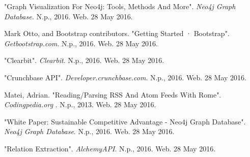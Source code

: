 \begin{thebibliography}{9}
	"Graph Visualization For Neo4j: Tools, Methods And More". \textit{Neo4j Graph Database.} N.p., 2016. Web. 28 May 2016.
	
	Mark Otto, and Bootstrap contributors. "Getting Started · Bootstrap". 
	\textit{Getbootstrap.com}. N.p., 2016. Web. 28 May 2016.
	
	"Clearbit". \textit{Clearbit}. N.p., 2016. Web. 28 May 2016.
	
	"Crunchbase API". 
	\textit{Developer.crunchbase.com}. N.p., 2016. Web. 28 May 2016.
	
	Matei, Adrian. "Reading/Parsing RSS And Atom Feeds With Rome". 
	\textit{Codingpedia.org}
	. N.p., 2013. Web. 28 May 2016.
	
	"White Paper: Sustainable Competitive Advantage - Neo4j Graph Database".\textit{ Neo4j Graph Database}. N.p., 2016. Web. 28 May 2016.
	
	"Relation Extraction". \textit{AlchemyAPI}. N.p., 2016. Web. 28 May 2016.
\end{thebibliography}